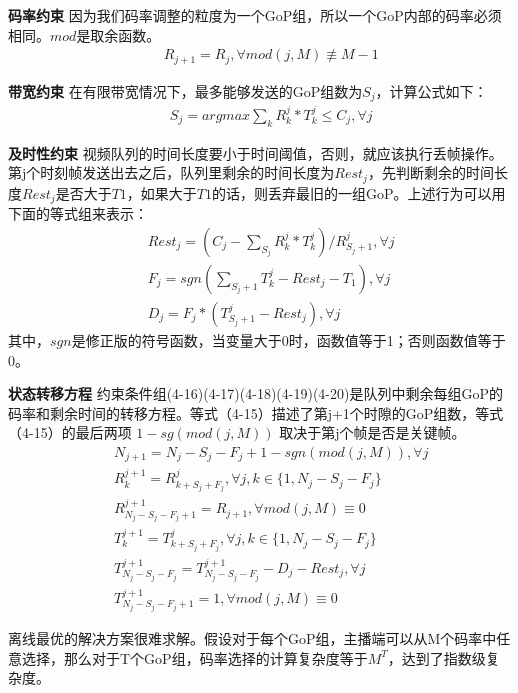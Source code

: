 \textbf{码率约束} 因为我们码率调整的粒度为一个GoP组，所以一个GoP内部的码率必须相同。$mod$是取余函数。
\begin{eqnarray}
  && R_{j+1}=R_j, \forall mod(j,M)\not\equiv M-1
\end{eqnarray}

\textbf{带宽约束} 在有限带宽情况下，最多能够发送的GoP组数为$S_j$，计算公式如下：
\begin{eqnarray}
  && S_j = argmax{\sum_k R_k^j*T_k^j \leq C_j}, \forall j
\end{eqnarray}

\textbf{及时性约束} 视频队列的时间长度要小于时间阈值，否则，就应该执行丢帧操作。第j个时刻帧发送出去之后，队列里剩余的时间长度为$Rest_j$，先判断剩余的时间长度$Rest_j$是否大于$T1$，如果大于$T1$的话，则丢弃最旧的一组GoP。上述行为可以用下面的等式组来表示：
\begin{eqnarray}
  && Rest_j = (C_j- \sum_{S_j} R_k^j*T_k^j)/R_{S_j+1}^j, \forall j \\
  && F_j = sgn(\sum_{S_j+1} T_k^j - Rest_j-T_1), \forall j \\
  && D_j = F_j*(T_{S_j+1}^j-Rest_j), \forall j
\end{eqnarray}
其中，$sgn$是修正版的符号函数，当变量大于0时，函数值等于1；否则函数值等于0。

\textbf{状态转移方程} 约束条件组(4-16)(4-17)(4-18)(4-19)(4-20)是队列中剩余每组GoP的码率和剩余时间的转移方程。等式（4-15）描述了第j+1个时隙的GoP组数，等式（4-15）的最后两项 $1-sg(mod(j,M))$ 取决于第j个帧是否是关键帧。
\begin{eqnarray}
  && N_{j+1}=N_j-S_j-F_j+1-sgn(mod(j,M)), \forall j \\
  && R_k^{j+1}=R_{k+S_j+F_j}^j, \forall j, k\in \{1,N_j-S_j-F_j\} \\
  && R_{N_j-S_j-F_j+1}^{j+1} = R_{j+1}, \forall mod(j,M) \equiv 0 \\
  && T_k^{j+1} = T_{k+S_j+F_j}^j, \forall j, k\in\{1, N_j-S_j-F_j\} \\
  && T_{N_j-S_j-F_j}^{j+1} = T_{N_j-S_j-F_j}^{j+1} - D_j - Rest_j , \forall j \\
  && T_{N_j-S_j-F_j+1}^{j+1}=1, \forall mod(j,M)\equiv 0
\end{eqnarray}

离线最优的解决方案很难求解。假设对于每个GoP组，主播端可以从M个码率中任意选择，那么对于T个GoP组，码率选择的计算复杂度等于$M^T$，达到了指数级复杂度。

